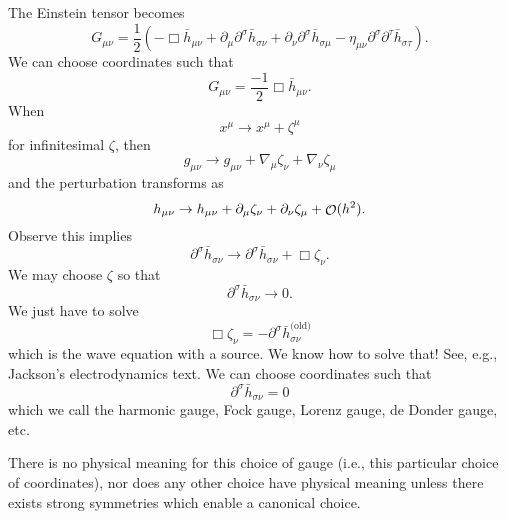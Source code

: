 The Einstein tensor becomes
\begin{equation}
G_{\mu\nu}=\frac{1}{2}(-\Box\bar{h}_{\mu\nu}+
\partial_{\mu}\partial^{\sigma}\bar{h}_{\sigma\nu}+
\partial_{\nu}\partial^{\sigma}\bar{h}_{\sigma\mu}-
\eta_{\mu\nu}\partial^{\sigma}\partial^{\tau}\bar{h}_{\sigma\tau}).
\end{equation}
We can choose coordinates such that
\begin{equation}
G_{\mu\nu}=\frac{-1}{2}\Box\bar{h}_{\mu\nu}.
\end{equation}
When
\begin{equation}
x^{\mu}\to x^{\mu}+\zeta^{\mu}
\end{equation}
for infinitesimal $\zeta$, then
\begin{equation}
g_{\mu\nu}\to
g_{\mu\nu}+\nabla_{\mu}\zeta_{\nu}+\nabla_{\nu}\zeta_{\mu}
\end{equation}
and the perturbation transforms as
\begin{equation}
h_{\mu\nu}\to h_{\mu\nu}+\partial_{\mu}\zeta_{\nu}+\partial_{\nu}\zeta_{\mu}
+\mathop{\mathcal{O}}\nolimits(h^{2}).
\end{equation}
Observe this implies
\begin{equation}
\partial^{\sigma}\bar{h}_{\sigma\nu}\to\partial^{\sigma}\bar{h}_{\sigma\nu}+\Box\zeta_{\nu}.
\end{equation}
We may choose $\zeta$ so that
\begin{equation}
\partial^{\sigma}\bar{h}_{\sigma\nu}\to0.
\end{equation}
We just have to solve
\begin{equation}
\Box\zeta_{\nu}=-\partial^{\sigma}\bar{h}^{\text{(old)}}_{\sigma\nu}
\end{equation}
which is the wave equation with a source. We know how to solve
that! See, e.g., Jackson's electrodynamics text. We can choose
coordinates such that
\begin{equation}
\partial^{\sigma}\bar{h}_{\sigma\nu}=0
\end{equation}
which we call the harmonic gauge, Fock gauge, Lorenz gauge, de
Donder gauge, etc.

\begin{rmk}
There is no physical meaning for this choice of gauge (i.e., this
particular choice of coordinates), nor does any other choice have
physical meaning unless there exists strong symmetries which
enable a canonical choice.
\end{rmk}

